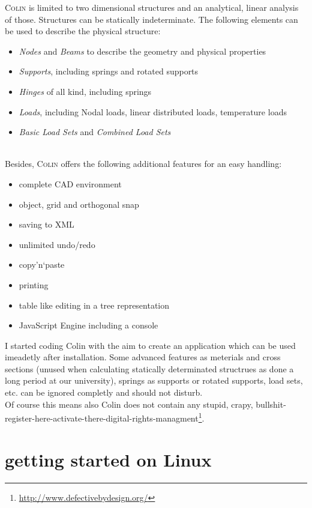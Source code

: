 \documentclass[a4paper,11pt]{report}
\newcommand{\Colin}[0]{\textsc{Colin }}
\begin{document}
\Colin is limited to two dimensional structures and an analytical, linear analysis of those. Structures can be statically indeterminate. The following elements can be used to describe the physical structure:
\begin{itemize}
	\item \textit{Nodes} and \textit{Beams} to describe the geometry and physical properties
	\item \textit{Supports}, including springs and rotated supports
	\item \textit{Hinges} of all kind, including springs
	\item \textit{Loads}, including Nodal loads, linear distributed loads, temperature loads
	\item \textit{Basic Load Sets} and \textit{Combined Load Sets}
\end{itemize}\\
Besides, \Colin offers the following additional features for an easy handling:
\begin{itemize}
	\item complete CAD environment
	\item object, grid and orthogonal snap
	\item saving to XML
	\item unlimited undo/redo
	\item copy'n`paste
	\item printing
	\item table like editing in a tree representation
	\item JavaScript Engine including a console
\end{itemize}

I started coding Colin with the aim to create an application which can be used imeadetly after installation. Some advanced features as meterials and cross sections (unused when calculating statically determinated structrues as done a long period at our university), springs as supports or rotated supports, load sets, etc. can be ignored completly and should not disturb.\\
Of course this means also Colin does not contain any stupid, crapy, bullshit-register-here-activate-there-digital-rights-managment\footnote{\url{http://www.defectivebydesign.org/}}. 


\section{getting started on Linux}
\label{sec:startLinux}
\end{document}
